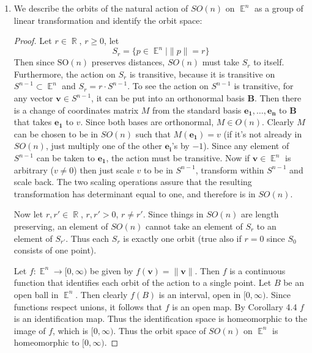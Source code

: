 \documentclass{book}
\DeclareMathOperator*{\R}{\mathbb{R}}
\DeclareMathOperator*{\E}{\mathbb{E}}
\begin{document}
\begin{enumerate}[(1)]
    \item We describe the orbits  of the natural action of $SO(n)$ on $\E^n$ as a group of linear transformation and identify the orbit space: 
        \begin{proof} Let $r\in \R$, $r\geq0$, let 
            \[S_r=\{p\in \E^n \mid \|p\|=r\}\]
            Then since $\text{SO}(n)$ preserves distances, $SO(n)$ must take $S_r$ to itself.  Furthermore, the action on $S_r$ is transitive, because it is transitive on $S^{n-1}\subset \E^n$ and $S_r = r \cdot S^{n-1}$.  To see the action on $S^{n-1}$ is transitive, for any vector $\mathbf{v} \in S^{n-1}$, it can be put into an orthonormal basis $\mathbf{B}$.  Then there is a change of coordinates matrix $M$ from the standard basis $\mathbf{e_1}, \dots, \mathbf{e_n}$ to $\mathbf{B}$ that takes $\mathbf{e_1}$ to $v$.  Since both bases are orthonormal, $M \in O(n)$.  Clearly $M$ can be chosen to be in $SO(n)$ such that $M(\mathbf{e_1})=v$ (if it's not already in $SO(n)$, just multiply one of the other $\mathbf{e_i}$'s by $-1$). Since any element of $S^{n-1}$ can be taken to $\mathbf{e_1}$, the action must be transitive.  Now if $\mathbf{v} \in \E^n$ is arbitrary ($v \neq 0$) then just scale $v$ to be in $S^{n-1}$, transform within $S^{n-1}$ and scale back.  The two scaling operations assure that the resulting transformation has determinant equal to one, and therefore is in $SO(n)$.

            \par Now let $r,r'\in \R$, $r,r'>0$, $r \neq r'$.  Since things in $SO(n)$ are length preserving, an element of $SO(n)$ cannot take an element of $S_r$ to an element of $S_{r'}$.  Thus each $S_r$ is exactly one orbit (true also if $r=0$ since $S_0$ consists of one point).

            \par Let $f:\E^n \rightarrow [0,\infty)$ be given by $f(\mathbf{v})=\|\mathbf{v}\|$.  Then $f$ is a continuous function that identifies each orbit of the action to a single point. Let $B$ be an open ball in $\E^n$.  Then clearly $f(B)$ is an interval, open in $[0,\infty)$.  Since functions respect unions, it follows that $f$ is an open map.  By Corollary 4.4 $f$ is an identification map.  Thus the identification space is homeomorphic to the image of $f$, which is $[0,\infty)$.  Thus the orbit space of $SO(n)$ on $\E^n$ is homeomorphic to $[0,\infty)$.
        \end{proof}


\end{enumerate}
\end{document}
